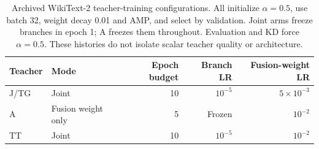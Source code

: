 \begin{table}[!t]\centering
\begin{tabular}{llrrr}
\toprule
Teacher & Mode & Epoch budget & Branch LR & Fusion-weight LR\\
\midrule
J/TG & Joint & 10 & $10^{-5}$ & $5\times10^{-3}$\\
A & Fusion weight only & 5 & Frozen & $10^{-2}$\\
TT & Joint & 10 & $10^{-5}$ & $10^{-2}$\\
\bottomrule
\end{tabular}
\caption{Archived WikiText-2 teacher-training configurations. All initialize $\alpha=0.5$, use batch 32, weight decay 0.01 and AMP, and select by validation. Joint arms freeze branches in epoch 1; A freezes them throughout. Evaluation and KD force $\alpha=0.5$. These histories do not isolate scalar teacher quality or architecture.}
\label{tab:teacher_training_protocol}
\end{table}
